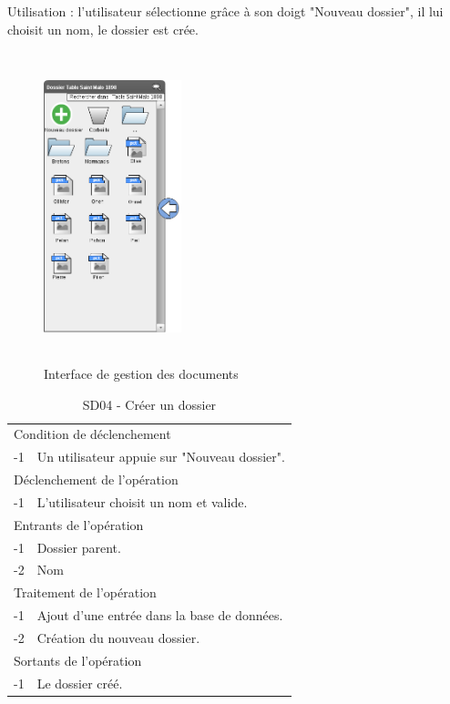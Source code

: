\documentclass[a4paper]{article}
\begin{document}
Utilisation : l'utilisateur sélectionne grâce à son doigt "Nouveau dossier", il lui choisit un nom, le dossier est crée.

\begin{figure}[H]
\centering
\includegraphics[width=4cm,height=9cm]{interface_mesdocuments.png}
\caption{Interface de gestion des documents}
\label{fig:interface_mesdocuments}
\end{figure}

\begin{table}[H]
  \centering
   \small
	\begin{tabular}{|c|p{12cm}|}
   		\hline
   			\rowcolor{lightgray}\multicolumn{2}{|c|}{\textbf{SD04 - Créer un dossier}} \\
   		\hline
   			\multicolumn{2}{|l|}{Condition de d\'eclenchement} \\
   		\hline
   			-1 & Un utilisateur appuie sur "Nouveau dossier". \\
   		\hline
   			\multicolumn{2}{|l|}{D\'eclenchement de l'op\'eration} \\
   		\hline
   			-1 & L'utilisateur choisit un nom et valide. \\
   		\hline
   			\multicolumn{2}{|l|}{Entrants de l'op\'eration} \\
   		\hline
   			-1 & Dossier parent.\\
        		-2 & Nom\\
   		\hline
   			\multicolumn{2}{|l|}{Traitement de l'op\'eration} \\
  		\hline
   			-1 & Ajout d'une entr\'ee dans la base de donn\'ees. \\
			-2 & Création du nouveau dossier. \\
   		\hline
   			\multicolumn{2}{|l|}{Sortants de l'op\'eration} \\
   		\hline
   			-1 & Le dossier créé. \\
   		\hline
	\end{tabular}
  \caption{SD04 - Créer un dossier}
  \normalsize
  \label{tab:creer_document}
\end{table}
\end{document}
